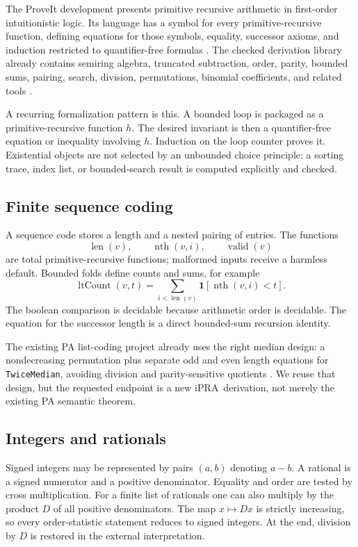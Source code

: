 \documentclass[11pt]{article}
\newcommand{\iPRA}{\ensuremath{\mathrm{iPRA}}}
\newcommand{\ind}{\mathbf 1}
\begin{document}
The ProveIt development presents primitive recursive arithmetic in
first-order intuitionistic logic.  Its language has a symbol for every
primitive-recursive function, defining equations for those symbols, equality,
successor axioms, and induction restricted to quantifier-free formulas
\cite{proveit-ipra}.  The checked derivation library already contains semiring
algebra, truncated subtraction, order, parity, bounded sums, pairing, search,
division, permutations, binomial coefficients, and related tools
\cite{proveit-derivations}.

A recurring formalization pattern is this.  A bounded loop is packaged as a
primitive-recursive function $h$.  The desired invariant is then a
quantifier-free equation or inequality involving $h$.  Induction on the loop
counter proves it.  Existential objects are not selected by an unbounded
choice principle: a sorting trace, index list, or bounded-search result is
computed explicitly and checked.

\subsection{Finite sequence coding}

A sequence code stores a length and a nested pairing of entries.  The
functions
\[
  \operatorname{len}(v),\qquad \operatorname{nth}(v,i),\qquad
  \operatorname{valid}(v)
\]
are total primitive-recursive functions; malformed inputs receive a harmless
default.  Bounded folds define counts and sums, for example
\[
 \operatorname{ltCount}(v,t)
   =\sum_{i<\operatorname{len}(v)}
      \ind[\operatorname{nth}(v,i)<t].
\]
The boolean comparison is decidable because arithmetic order is decidable.
The equation for the successor length is a direct bounded-sum recursion
identity.

The existing PA list-coding project already uses the right median design: a
nondecreasing permutation plus separate odd and even length equations for
\texttt{TwiceMedian}, avoiding division and parity-sensitive quotients
\cite{proveit-listcoding}.  We reuse that design, but the requested endpoint
is a new \iPRA\ derivation, not merely the existing PA semantic theorem.

\subsection{Integers and rationals}

Signed integers may be represented by pairs $(a,b)$ denoting $a-b$.  A
rational is a signed numerator and a positive denominator.  Equality and order
are tested by cross multiplication.  For a finite list of rationals one can
also multiply by the product $D$ of all positive denominators.  The map
$x\mapsto Dx$ is strictly increasing, so every order-statistic statement
reduces to signed integers.  At the end, division by $D$ is restored in the
external interpretation.
\end{document}

